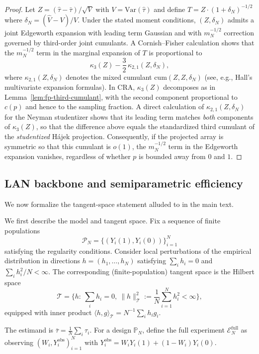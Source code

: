 \documentclass[aos]{imsart}
\theoremstyle{definition}
\theoremstyle{plain}
\begin{document}
\begin{proof}
Let $Z=(\hat\tau-\bar\tau)/\sqrt{V}$ with $V=\mathrm{Var}(\hat\tau)$ and define $T=Z\cdot(1+\delta_N)^{-1/2}$ where
$\delta_N=(\hat V-V)/V$.
Under the stated moment conditions, $(Z,\delta_N)$ admits a joint Edgeworth expansion with leading term Gaussian and with
$m_N^{-1/2}$ correction governed by third-order joint cumulants.
A Cornish--Fisher calculation shows that the $m_N^{-1/2}$ term in the marginal expansion of $T$ is proportional to
\[
\kappa_3(Z)-\frac{3}{2}\,\kappa_{2,1}(Z,\delta_N),
\]
where $\kappa_{2,1}(Z,\delta_N)$ denotes the mixed cumulant $\mathrm{cum}(Z,Z,\delta_N)$ (see, e.g., Hall's multivariate expansion formulas).
In CRA, $\kappa_3(Z)$ decomposes as in Lemma~\ref{lem:fp-third-cumulant}, with the second component proportional to $c(p)$ and hence to the sampling fraction.
A direct calculation of $\kappa_{2,1}(Z,\delta_N)$ for the Neyman studentizer shows that its leading term matches \emph{both} components of $\kappa_3(Z)$,
so that the difference above equals the standardized third cumulant of the \emph{studentized} Hájek projection.
Consequently, if the projected array is symmetric so that this cumulant is $o(1)$, the $m_N^{-1/2}$ term in the Edgeworth expansion vanishes,
regardless of whether $p$ is bounded away from $0$ and $1$.
\end{proof}

\subsection{LAN backbone and semiparametric efficiency}\label{app:semi-eff}

We now formalize the tangent-space statement alluded to in the main text.

We first describe the model and tangent space. Fix a sequence of finite populations
\[
\mathcal P_N=\{(Y_i(1),Y_i(0))\}_{i=1}^N
\]
satisfying the regularity conditions.
Consider local perturbations of the empirical distribution in directions $h=(h_1,\dots,h_N)$ satisfying $\sum_i h_i=0$ and $\sum_i h_i^2/N<\infty$.
The corresponding (finite-population) tangent space is the Hilbert space
\[
\mathcal T=\Big\{h:\ \sum_i h_i=0,\ \|h\|_{\mathcal T}^2:=\frac{1}{N}\sum_{i=1}^N h_i^2<\infty\Big\},
\]
equipped with inner product $\langle h,g\rangle_{\mathcal T}=N^{-1}\sum_i h_i g_i$.

The estimand is $\bar\tau=\frac1N\sum_i \tau_i$.
For a design $\mathbb P_N$, define the full experiment $\mathcal E_N^\mathrm{full}$ as observing $(W_i,Y_i^\mathrm{obs})_{i=1}^N$ with
$Y_i^\mathrm{obs}=W_iY_i(1)+(1-W_i)Y_i(0)$.
\end{document}
